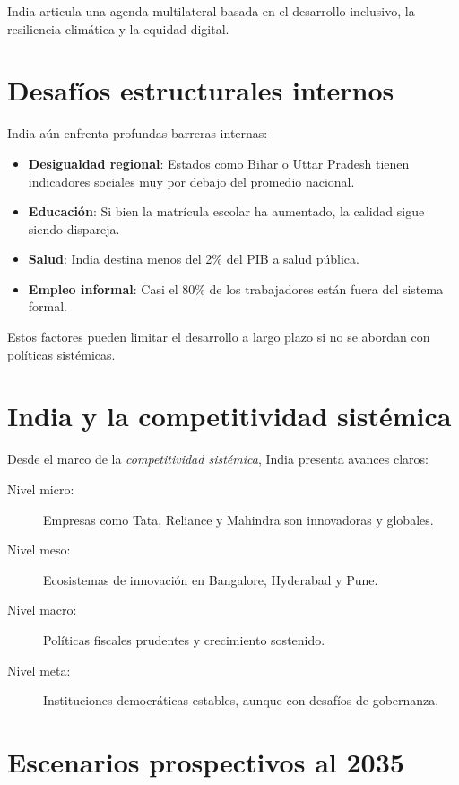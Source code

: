 \documentclass[12pt]{article}
\begin{document}
India articula una agenda multilateral basada en el desarrollo inclusivo, la resiliencia climática y la equidad digital.

\section{Desafíos estructurales internos}

India aún enfrenta profundas barreras internas:

\begin{itemize}
  \item \textbf{Desigualdad regional}: Estados como Bihar o Uttar Pradesh tienen indicadores sociales muy por debajo del promedio nacional.
  \item \textbf{Educación}: Si bien la matrícula escolar ha aumentado, la calidad sigue siendo dispareja.
  \item \textbf{Salud}: India destina menos del 2\% del PIB a salud pública.
  \item \textbf{Empleo informal}: Casi el 80\% de los trabajadores están fuera del sistema formal.
\end{itemize}

Estos factores pueden limitar el desarrollo a largo plazo si no se abordan con políticas sistémicas.

\section{India y la competitividad sistémica}

Desde el marco de la \textit{competitividad sistémica}, India presenta avances claros:

\begin{description}
  \item[Nivel micro:] Empresas como Tata, Reliance y Mahindra son innovadoras y globales.
  \item[Nivel meso:] Ecosistemas de innovación en Bangalore, Hyderabad y Pune.
  \item[Nivel macro:] Políticas fiscales prudentes y crecimiento sostenido.
  \item[Nivel meta:] Instituciones democráticas estables, aunque con desafíos de gobernanza.
\end{description}

\section{Escenarios prospectivos al 2035}
\end{document}
